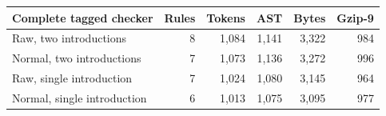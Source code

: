 \begin{center}
\small
\setlength{\tabcolsep}{5pt}
\begin{tabular}{lrrrrr}
\toprule
Complete tagged checker & Rules & Tokens & AST & Bytes & Gzip-9\\
\midrule
Raw, two introductions & 8 & 1,084 & 1,141 & 3,322 & 984 \\
Normal, two introductions & 7 & 1,073 & 1,136 & 3,272 & 996 \\
Raw, single introduction & 7 & 1,024 & 1,080 & 3,145 & 964 \\
Normal, single introduction & 6 & 1,013 & 1,075 & 3,095 & 977 \\
\bottomrule
\end{tabular}
\end{center}
